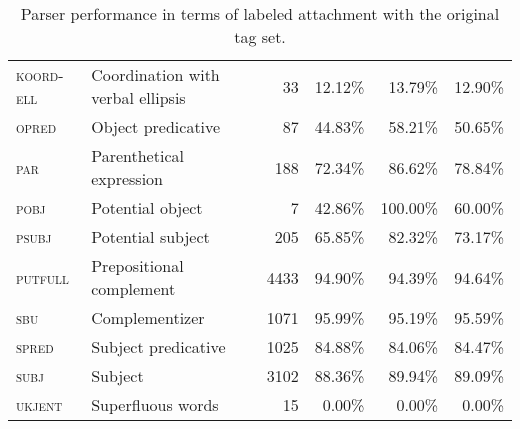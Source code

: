 \documentclass[a4paper,12pt,english]{book}
\begin{document}
\begin{table}
\begin{tabular}{@{}llrrrr@{}}
        \textsc{koord-ell} & Coordination with verbal ellipsis & 33 & 12.12\% &
        13.79\% & 12.90\% \\
        \textsc{opred} & Object predicative & 87 & 44.83\% & 58.21\% & 50.65\% \\
        \textsc{par} & Parenthetical expression & 188 & 72.34\% & 86.62\% & 78.84\% \\
        \textsc{pobj} & Potential object & 7 & 42.86\% & 100.00\% & 60.00\% \\
        \textsc{psubj} & Potential subject & 205 & 65.85\% & 82.32\% & 73.17\% \\
        \textsc{putfull} & Prepositional complement & 4433 & 94.90\% & 94.39\% & 94.64\% \\
        \textsc{sbu} & Complementizer & 1071 & 95.99\% & 95.19\% & 95.59\% \\
        \textsc{spred} & Subject predicative & 1025 & 84.88\% & 84.06\% & 84.47\% \\
        \textsc{subj} & Subject & 3102 & 88.36\% & 89.94\% & 89.09\% \\
        \textsc{ukjent} & Superfluous words  & 15 & 0.00\% & 0.00\% & 0.00\% \\
        \bottomrule
    \end{tabular}
    \caption{Parser performance in terms of labeled attachment with the original tag
        set.}
    \label{baselineparseerror}
\end{table}
\end{document}
